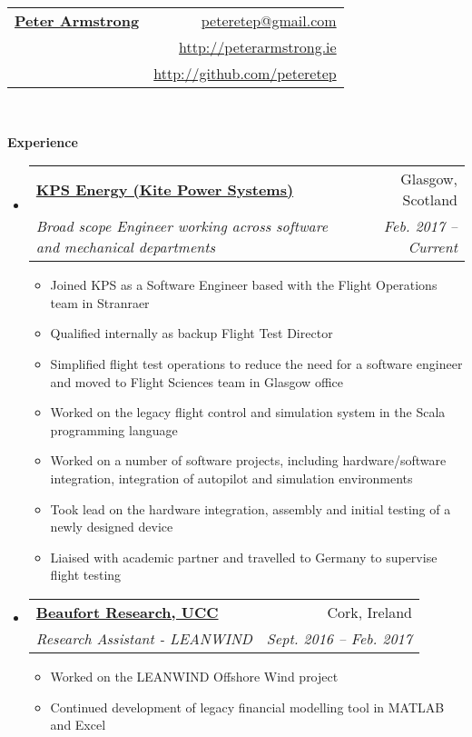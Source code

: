 \documentclass[letterpaper,11pt]{article}
\makeatletter
\newcommand{\resitem}[1]{\item #1 \vspace{-2pt}}
\newcommand{\resheading}[1]{{\large \colorbox{mygrey}{\begin{minipage}{\textwidth}{\textbf{#1 \vphantom{p\^{E}}}}\end{minipage}}}}
\newcommand{\ressubheading}[4]{
\begin{tabular*}{6.5in}{l@{\extracolsep{\fill}}r}
		\textbf{#1} & #2 \\
		\textit{#3} & \textit{#4} \\
\end{tabular*}\vspace{-6pt}}
\makeatother
\begin{document}
\newcommand{\mywebheader}{
\begin{tabular*}{7in}{l@{\extracolsep{\fill}}r}
	\textbf{\href{http://peterarmstrong.ie/}{\LARGE Peter Armstrong}} & \href{mailto:peteretep@gmail.com}{peteretep@gmail.com}\\
	& \href{http://peterarmstrong.ie}{http://peterarmstrong.ie} \\
	& \href{http://github.com/peteretep}{http://github.com/peteretep}
	\end{tabular*}
\\
\vspace{0.1in}}

\mywebheader

\resheading{Experience}
  
	\begin{itemize}
    \item 
      \ressubheading{\href{http://www.kps.energy}{KPS Energy (Kite Power Systems)}}{Glasgow, Scotland}
        {Broad scope Engineer working across software and mechanical departments }{Feb. 2017 -- Current}
        {
        \begin{itemize}
          \resitem{Joined KPS as a Software Engineer based with the Flight Operations team in Stranraer}
          \resitem{Qualified internally as backup Flight Test Director }
          \resitem{Simplified flight test operations to reduce the need for a software engineer and moved to Flight Sciences team in Glasgow office}
          \resitem{Worked on the legacy flight control and simulation system in the Scala programming language}
          \resitem{Worked on a number of software projects, including hardware/software integration, integration of autopilot and simulation environments}
          \resitem{Took lead on the hardware integration, assembly and initial testing of a newly designed device }
          \resitem{Liaised with academic partner and travelled to Germany to supervise flight testing}
          
        \end{itemize}
        }

    \item 
      \ressubheading{\href{http://www.ucc.ie}{Beaufort Research, UCC}}{Cork, Ireland}
        {Research Assistant - LEANWIND}{Sept. 2016 -- Feb. 2017  }
        {
        \begin{itemize}
          \resitem{Worked on the LEANWIND Offshore Wind project}
          \resitem{Continued development of legacy financial modelling tool in MATLAB and Excel}
        \end{itemize}
        }


\end{itemize}
\end{document}
